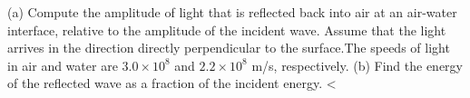 (a) Compute the amplitude of light that is reflected back into
air at an air-water interface, relative to the amplitude of
the incident wave. Assume that the light arrives in the direction
directly perpendicular to the surface.The speeds of light in air and water are
$3.0\times10^8$ and $2.2\times10^8$ m/s, respectively.\hwendpart
(b) Find the energy of the reflected wave as a fraction of
the incident energy.
<%
\answercheck

